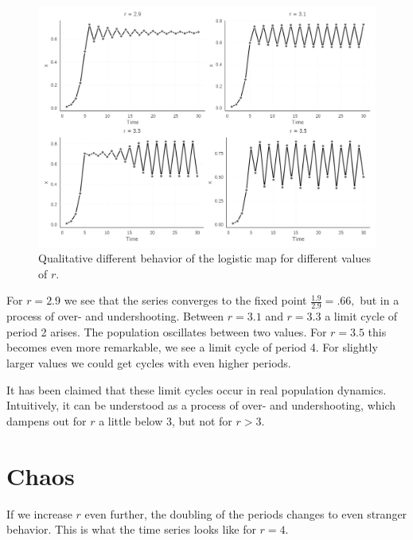 \documentclass[
  a4paper,
  DIV=11,
  numbers=noendperiod,
  oneside]{scrreprt}
\begin{document}
\begin{figure}

{\centering \includegraphics{media/ch2/fig-ch2-img4.jpg}

}

\caption{\label{fig-ch2-img4}Qualitative different behavior of the
logistic map for different values of \(r\).}

\end{figure}

For \(r = 2.9\) we see that the series converges to the fixed point
\(\frac{1.9}{2.9} = .66,\) but in a process of over- and undershooting.
Between \(r = 3.1\) and \(r = 3.3\) a limit cycle of period 2 arises.
The population oscillates between two values. For \(r = 3.5\) this
becomes even more remarkable, we see a limit cycle of period 4. For
slightly larger values we could get cycles with even higher periods.

It has been claimed that these limit cycles occur in real population
dynamics. Intuitively, it can be understood as a process of over- and
undershooting, which dampens out for \(r\) a little below 3, but not for
\(r > 3\).

\hypertarget{sec-Chaos}{%
\section{Chaos}\label{sec-Chaos}}

If we increase \(r\) even further, the doubling of the periods changes
to even stranger behavior. This is what the time series looks like for
\(r = 4\).
\end{document}
